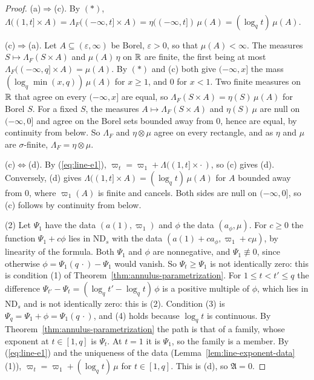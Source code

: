 \begin{proof}
(a)$\Rightarrow$(c). By $(*)$, $\Lambda((1,t] \times A) = \Lambda_F((-\infty,t] \times A)
= \eta((-\infty,t])\,\mu(A) = (\log_qt)\,\mu(A)$.

(c)$\Rightarrow$(a). Let $A \subseteq (\varepsilon,\infty)$ be Borel, $\varepsilon > 0$, so that
$\mu(A) < \infty$. The measures $S \mapsto \Lambda_F(S \times A)$ and $\mu(A)\,\eta$ on $\mathbb{R}$ are
finite, the first being at most $\Lambda_F((-\infty,q] \times A) = \mu(A)$. By $(*)$ and (c) both
give $(-\infty,x]$ the mass $(\log_q\min(x,q))\,\mu(A)$ for $x \ge 1$, and $0$ for $x < 1$. Two
finite measures on $\mathbb{R}$ that agree on every $(-\infty,x]$ are equal, so
$\Lambda_F(S \times A) = \eta(S)\,\mu(A)$ for Borel $S$. For a fixed $S$, the measures
$A \mapsto \Lambda_F(S \times A)$ and $\eta(S)\,\mu$ are null on $(-\infty,0]$ and agree on the
Borel sets bounded away from $0$, hence are equal, by continuity from below. So $\Lambda_F$ and
$\eta \otimes \mu$ agree on every rectangle, and as $\eta$ and $\mu$ are $\sigma$-finite,
$\Lambda_F = \eta \otimes \mu$.

(c)$\Leftrightarrow$(d). By (\ref{eq:line-e1}), $\varpi_t = \varpi_1 + \Lambda((1,t] \times \cdot\,)$, so (c)
gives (d). Conversely, (d) gives $\Lambda((1,t] \times A) = (\log_qt)\,\mu(A)$ for $A$ bounded away
from $0$, where $\varpi_1(A)$ is finite and cancels. Both sides are null on $(-\infty,0]$, so (c)
follows by continuity from below.

(2) Let $\Psi_1$ have the data $(a(1), \varpi_1)$ and $\phi$ the data $(a_\phi, \mu)$. For $c \ge 0$
the function $\Psi_1 + c\phi$ lies in $\mathrm{ND}_s$ with the data
$(a(1) + ca_\phi, \varpi_1 + c\mu)$, by linearity of the formula. Both $\Psi_1$ and $\phi$ are
nonnegative, and $\Psi_1 \not\equiv 0$, since otherwise $\phi = \Psi_1(q\,\cdot) - \Psi_1$ would
vanish. So $\Psi_t \ge \Psi_1$ is not identically zero: this is condition (1) of
Theorem~\ref{thm:annulus-parametrization}. For $1 \le t < t' \le q$ the difference
$\Psi_{t'} - \Psi_t = (\log_qt' - \log_qt)\,\phi$ is a positive multiple of $\phi$, which lies in
$\mathrm{ND}_s$ and is not identically zero: this is (2). Condition (3) is
$\Psi_q = \Psi_1 + \phi = \Psi_1(q\,\cdot)$, and (4) holds because $\log_qt$ is continuous. By
Theorem~\ref{thm:annulus-parametrization} the path is that of a family, whose exponent at
$t \in [1,q]$ is $\Psi_t$. At $t = 1$ it is $\Psi_1$, so the family is a member. By
(\ref{eq:line-e1}) and the uniqueness of the data (Lemma~\ref{lem:line-exponent-data}(1)),
$\varpi_t = \varpi_1 + (\log_qt)\,\mu$ for $t \in [1,q]$. This is (d), so $\mathfrak{A} = 0$.


\end{proof}
